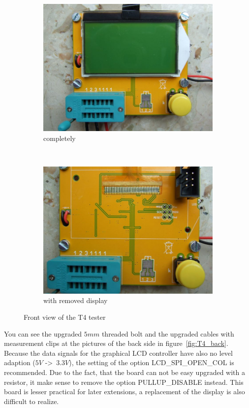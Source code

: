 \begin{figure}[H]
  \begin{subfigure}[b]{.5\textwidth}
    \centering
    \includegraphics[width=1.\textwidth]{../PNG/T4_front.JPG}
    \caption{completely}
  \end{subfigure}
  ~
  \begin{subfigure}[b]{.5\textwidth}
    \centering
    \includegraphics[width=1.\textwidth]{../PNG/T4_front_noLCD.JPG}
    \caption{with removed display}
  \end{subfigure}
  \caption{Front view of the T4 tester}
  \label{fig:T4_front}
\end{figure}

You can see the upgraded \(5mm\) threaded bolt and the upgraded cables with measurement clips
at the pictures of the back side in figure~\ref{fig:T4_back}.
Because the data signals for the graphical LCD controller have also no
level adaption (\(5V\) -\textgreater~\(3.3V\)), the setting of the option LCD\_SPI\_OPEN\_COL is recommended.
Due to the fact, that the board can not be easy upgraded with a  resistor,
it make sense to remove the option PULLUP\_DISABLE instead. 
This board is lesser practical for later extensions, a replacement of the display is
also difficult to realize.

